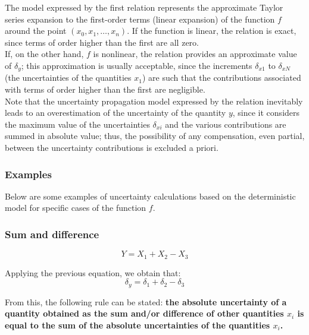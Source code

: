 \documentclass[../main.tex]{subfiles}
\begin{document}
The model expressed by the first relation represents the approximate Taylor series expansion to the first-order terms (linear expansion) of the function $f$ around the point $(x_0, x_1, \dots, x_n)$. If the function is linear, the relation is exact, since terms of order higher than the first are all zero. \\

If, on the other hand, $f$ is nonlinear, the relation provides an approximate value of $\delta_y$; this approximation is usually acceptable, since the increments $\delta_{x1}$ to $\delta_{xN}$ (the uncertainties of the quantities $x_1$) are such that the contributions associated with terms of order higher than the first are negligible.\\

Note that the uncertainty propagation model expressed by the relation inevitably leads to an overestimation of the uncertainty of the quantity $y$, since it considers the maximum value of the uncertainties $\delta_{xi}$ and the various contributions are summed in absolute value; thus, the possibility of any compensation, even partial, between the uncertainty contributions is excluded a priori.

\subsubsection{Examples}

Below are some examples of uncertainty calculations based on the deterministic model for specific cases of the function $f$.

\subsubsection*{Sum and difference}

\begin{equation}
	Y = X_1 + X_2 - X_3
\end{equation}

Applying the previous equation, we obtain that:\\

\begin{equation}
	\delta_y = \delta_1 + \delta_2 - \delta_3
\end{equation}

From this, the following rule can be stated: \textbf{the absolute uncertainty of a quantity obtained as the sum and/or difference of other quantities $x_i$ is equal to the sum of the absolute uncertainties of the quantities $x_i$.}\\
\end{document}
